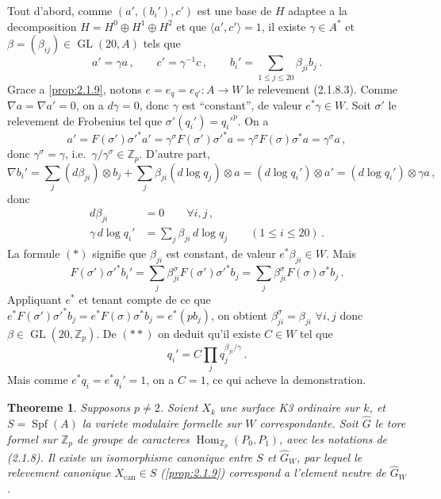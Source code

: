 \documentclass[12pt,a4paper]{article}
\theoremstyle{plain}
\newtheorem{theorem}{Theoreme}[section]
\theoremstyle{definition}
\theoremstyle{remark}
\DeclareMathOperator{\Spf}{Spf}
\DeclareMathOperator{\Hom}{Hom}
\DeclareMathOperator{\GL}{GL}
\begin{document}
Tout d'abord, comme $(a', (b_i'), c')$ est une base de $H$ adaptee a la decomposition $H = H^0 \oplus H^1 \oplus H^2$ et que $\langle a', c'\rangle = 1$, il existe $\gamma \in A^*$ et $\beta = (\beta_{ij}) \in \GL(20, A)$ tels que
\[
a' = \gamma a\,, \qquad c' = \gamma^{-1}c\,, \qquad b_i' = \sum_{1 \leq j \leq 20} \beta_{ji} b_j\,.\]
Grace a \ref{prop:2.1.9}, notons $e = e_q = e_{q'} : A \to W$ le relevement (2.1.8.3). Comme $\nabla a = \nabla a' = 0$, on a $d\gamma = 0$, donc $\gamma$ est ``constant'', de valeur $e^*\gamma \in W$. Soit $\sigma'$ le relevement de Frobenius tel que $\sigma'(q_i') = q_i'^p$. On a
\[
a' = F(\sigma')\sigma'^*a' = \gamma^\sigma F(\sigma')\sigma'^*a = \gamma^\sigma F(\sigma)\sigma^*a = \gamma^\sigma a\,,
\]
donc $\gamma^\sigma = \gamma$, i.e.\ $\gamma/\gamma^\sigma \in \mathbb{Z}_p$. D'autre part,
\[
\nabla b_i' = \sum_j (d\beta_{ji}) \otimes b_j + \sum_j \beta_{ji}(d\log q_j) \otimes a = (d\log q_i') \otimes a' = (d\log q_i') \otimes \gamma a\,,
\]
donc
\begin{align*}
d\beta_{ji} &= 0 \qquad \forall i,j\,, \tag{$*$}\\
\gamma\, d\log q_i' &= \sum_j \beta_{ji}\, d\log q_j \qquad (1 \leq i \leq 20)\,. \tag{$**$}
\end{align*}
La formule $(*)$ signifie que $\beta_{ji}$ est constant, de valeur $e^*\beta_{ji} \in W$. Mais
\[
F(\sigma')\sigma'^*b_i' = \sum_j \beta_{ji}^\sigma F(\sigma')\sigma'^*b_j = \sum_j \beta_{ji}^\sigma F(\sigma)\sigma^*b_j\,.\]
Appliquant $e^*$ et tenant compte de ce que $e^*F(\sigma')\sigma'^*b_j = e^*F(\sigma)\sigma^*b_j = e^*(pb_j)$, on obtient $\beta_{ji}^\sigma = \beta_{ji}$ $\forall i,j$ donc $\beta \in \GL(20, \mathbb{Z}_p)$. De $(**)$ on deduit qu'il existe $C \in W$ tel que
\[
q_i' = C \prod_j q_j^{\beta_{ji}/\gamma}\,.\]
Mais comme $e^*q_i = e^*q_i' = 1$, on a $C = 1$, ce qui acheve la demonstration.

\begin{theorem}\label{thm:2.1.14}
Supposons $p \neq 2$. Soient $X_k$ une surface K3 ordinaire sur $k$, et $S = \Spf(A)$ la variete modulaire formelle sur $W$ correspondante. Soit $\widehat{G}$ le tore formel sur $\mathbb{Z}_p$ de groupe de caracteres $\Hom_{\mathbb{Z}_p}(P_0, P_1)$, avec les notations de (2.1.8). Il existe un isomorphisme canonique entre $S$ et $\widehat{G}_W$, par lequel le relevement canonique $X_{\mathrm{can}} \in S$ (\ref{prop:2.1.9}) correspond a l'element neutre de $\widehat{G}_W$.
\end{theorem}
\end{document}

